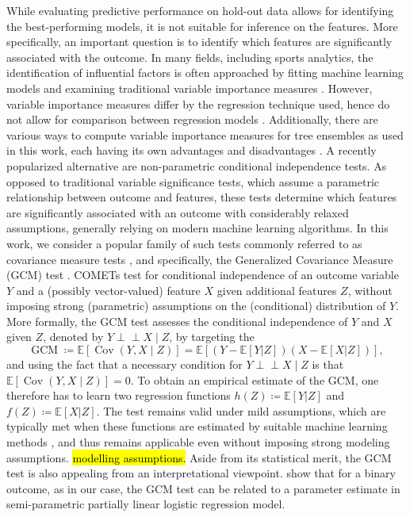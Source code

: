 \documentclass[namedate,webpdf,modern,medium]{oup-authoring-template}
\providecommand{\DIFadd}[1]{\ifmmode{#1}\else\hl{#1}\fi} %
\providecommand{\DIFdel}[1]{{\protect\color{red}#1}} %
\providecommand{\DIFaddbegin}{} %
\providecommand{\DIFaddend}{} %
\providecommand{\DIFdelbegin}{} %
\providecommand{\DIFdelend}{} %
\begin{document}
While evaluating predictive performance on hold-out data allows for identifying the best-performing models, it is not suitable for inference on the features. More specifically, an important question is to identify which features are significantly associated with the outcome. %
In many fields, including sports analytics, the identification of influential factors is often approached by fitting machine learning models and examining traditional variable importance measures \citep{bajons2025mlsi}. However, variable importance measures differ by the regression technique used, hence do not allow for comparison between regression models \citep{williamson20varimp}. Additionally, there are various ways to compute variable importance measures for tree ensembles as used in this work, each having its own advantages and disadvantages \citep{Strobl08varimp}. A recently popularized alternative are non-parametric conditional independence tests. As opposed to traditional variable significance tests, which assume a parametric relationship between outcome and features, these tests determine which features are significantly associated with an outcome with considerably relaxed assumptions, generally relying on modern machine learning algorithms. In this work, we consider a popular family of such tests commonly referred to as covariance measure tests \citep[COMETs, see, e.g.,][]{kook24comets}, and specifically, the Generalized Covariance Measure (GCM) test \citep{Shah20gcm}. COMETs test for conditional independence of an outcome variable $Y$ and a (possibly vector-valued) feature $X$ given additional features $Z$, without imposing strong (parametric) assumptions on the (conditional) distribution of $Y$.
More formally, the GCM test assesses the conditional independence of $Y$ and $X$ given $Z$, denoted by $Y \perp\!\!\!\perp X \mid Z$, by targeting the 
\begin{equation}\label{eq:GCM}
\operatorname{GCM} \coloneqq \mathbb{E}[\operatorname{Cov}(Y,X \mid Z)] =\mathbb{E}[(Y -
\mathbb{E}[Y | Z])(X - \mathbb{E}[X | Z])],
\end{equation}
and using the fact that a necessary condition for $Y \perp\!\!\!\perp X \mid Z$ is that $\mathbb{E}[\operatorname{Cov}(Y,X \mid Z)] = 0$. To obtain an empirical estimate of the GCM, one therefore has to learn two regression functions $h(Z) \coloneqq \mathbb{E}[Y | Z]$ and $f(Z) \coloneqq \mathbb{E}[X | Z]$. The test remains valid under mild assumptions, which are typically met when these functions are estimated by suitable machine learning methods \citep{Shah20gcm}, and thus remains applicable even without imposing strong \DIFdelbegin \DIFdel{modeling assumptions.
}\DIFdelend \DIFaddbegin \DIFadd{modelling assumptions.
}\DIFaddend Aside from its statistical merit, the GCM test is also appealing from an interpretational viewpoint. \citet{bajons2025rGAX} show that for a binary outcome, as in our case, the GCM test can be related to a parameter estimate in semi-parametric partially linear logistic regression model.
\end{document}
